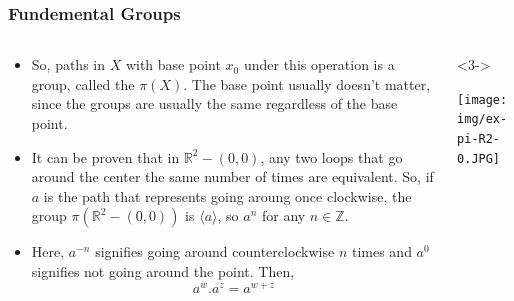 \documentclass[8pt]{beamer}
\begin{document}
  \begin{frame}
    \frametitle{Fundemental Groups}
    \begin{columns}
      \begin{column}[T]{0.5\textwidth}
        \begin{itemize}
          \item<1-> So, paths in $X$ with base point $x_0$ under this operation is a
            group, called the $\pi(X)$. The base point usually doesn't matter,
            since the groups are usually the same regardless of the base point.
          \item<2-> It can be proven that in $\mathbb{R}^2 - (0,0)$, any two loops
            that go around the center the same number of times are equivalent.
            So, if $a$ is the path that represents going aroung once clockwise,
            the group $\pi(\mathbb{R}^2 - (0,0))$ is $\langle a\rangle $, so
            $a^n$ for any $n \in \mathbb{Z}$.
            \pause
          \item<4-> Here, $a^{-n}$ signifies going around counterclockwise $n$ times
            and $a^0$ signifies not going around the point. Then,
            \[a^w . a^z = a^{w+z}\]
        \end{itemize}
      \end{column}
      \begin{column}[T]{0.5\textwidth}<3->
        \begin{center}
        \texttt{[image: img/ex-pi-R2-0.JPG]}
        \end{center}
      
      \end{column}
    \end{columns}
  \end{frame}
\end{document}
